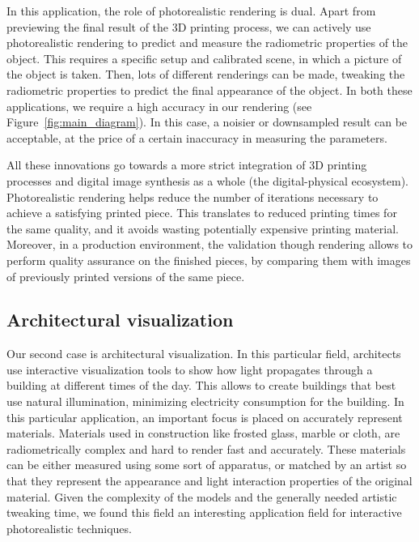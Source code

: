 In this application, the role of photorealistic rendering is dual. Apart from previewing the final result of the 3D printing process,   we can actively use photorealistic rendering to predict and measure the radiometric properties of the object. This requires a  specific setup and calibrated scene, in which a picture of the object is taken. Then, lots of different renderings can be made, tweaking the radiometric properties to predict the final appearance of the object. In both these applications, we require a high accuracy in our rendering (see Figure~\ref{fig:main_diagram}). In this case, a noisier or downsampled result can be acceptable, at the price of a certain inaccuracy in measuring the parameters. 

All these innovations go towards a more strict integration of 3D printing processes and digital image synthesis as a whole (the digital-physical ecosystem). Photorealistic rendering helps reduce the number of iterations necessary to achieve a satisfying printed piece. This translates to reduced printing times for the same quality, and it avoids wasting potentially expensive printing material. Moreover, in a production environment, the validation though rendering allows to perform quality assurance on the finished pieces, by comparing them with images of previously printed versions of the same piece.


\subsection{Architectural visualization}

Our second case is architectural visualization. In this particular field, architects use interactive visualization tools to show how light propagates through a building at different times of the day. This allows to create buildings that best use natural illumination, minimizing electricity consumption for the building. In this particular application, an important focus is placed on accurately represent materials. Materials used in construction like frosted glass, marble or cloth, are radiometrically complex and hard to render fast and accurately. These materials can be either measured using some sort of apparatus, or matched by an artist so that they represent the appearance and light interaction properties of the original material. Given the complexity of the models and the generally needed artistic tweaking time, we found this field an interesting application field for interactive photorealistic techniques.

